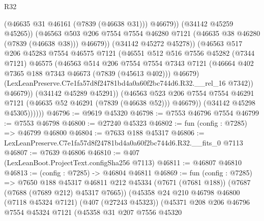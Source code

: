 \begin{lexlean}{R32}
\begin{coremodule}
                              (@46635 @31 @46161 (@7839 (@46638 @31)))
                              @46679))
                          (@34142 @45259 @45265))
                        (@46563
                          @503
                          @206
                          @7554
                          @7554
                          @46280
                          @7121
                          (@46635 @38 @46280 (@7839 (@46638 @38)))
                          @46679))
                      (@34142 @45272 @45278))
                    (@46563
                      @517
                      @206
                      @45283
                      @7554
                      @46575
                      @7121
                      (@46551
                        @512
                        @516
                        @7556
                        @45282
                        (@7344 @7121)
                        @46575
                        (@46563
                          @514
                          @206
                          @7554
                          @7554
                          @7343
                          @7121
                          (@46664 @402 @7365 @188 @7343 @46673 (@7839 (@45613 @402)))
                          @46679)
                        (LexLeanPreserve.C7e1fa57d8f24781bd4a0a60f2bc744d6.R32.__rel_16 @7342))
                      @46679))
                  (@34142 @45289 @45291))
                (@46563
                  @523
                  @206
                  @7554
                  @7554
                  @46291
                  @7121
                  (@46635 @52 @46291 (@7839 (@46638 @52)))
                  @46679))
              (@34142 @45298 @45305))))))
@46796 := @9619 @45320
@46798 := @7553 @46796 @7554
@46799 := @7553 @46798
@46800 := @27240 @45323
@46802 := fun (config : @7285) => @46799 @46800
@46804 := @7633 @188 @45317
@46806 := LexLeanPreserve.C7e1fa57d8f24781bd4a0a60f2bc744d6.R32.__fits_0 @7113
@46807 := @7639 @46806
@46810 := @407 (LexLeanBoot.ProjectText.configSha256 @7113)
@46811 := @46807 @46810
@46813 := (config : @7285) -> @46804 @46811
@46869 := fun (config : @7285) =>
  @7650
    @188
    @45317
    @46811
    @212
    @45334
    (@7671 (@7681 @188))
    (@7687 (@7688 (@7689 @212) @45317 @7665))
    (@45358
      @24
      @210
      @46798
      @46800
      (@7118 @45324 @7121)
      (@407 (@27243 @45323))
      (@45371
        @208
        @206
        @46796
        @7554
        @45324
        @7121
        (@45358
          @31
          @207
          @7556
          @45320

\end{coremodule}
\end{lexlean}
